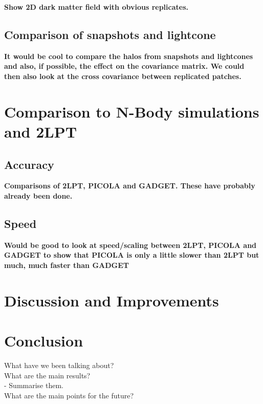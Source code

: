 \documentclass[5p,authoryear]{elsarticle}
\begin{document}
\textbf{Show 2D dark matter field with obvious replicates.}

\subsection{Comparison of snapshots and lightcone}

\textbf{It would be cool to compare the halos from snapshots and lightcones and also, if possible, the effect on the covariance matrix. We could then also look at the cross covariance between replicated patches.}

\section{Comparison to N-Body simulations and 2LPT}

\subsection{Accuracy}

\textbf{Comparisons of 2LPT, PICOLA and GADGET. These have probably already been done.}

\subsection{Speed}

\textbf{Would be good to look at speed/scaling between 2LPT, PICOLA and GADGET to show that PICOLA is only a little slower than 2LPT but much, much faster than GADGET}

\section{Discussion and Improvements}

\section{Conclusion}
What have we been talking about? \\
What are the main results? \\
 - Summarise them. \\
What are the main points for the future? 
\end{document}
